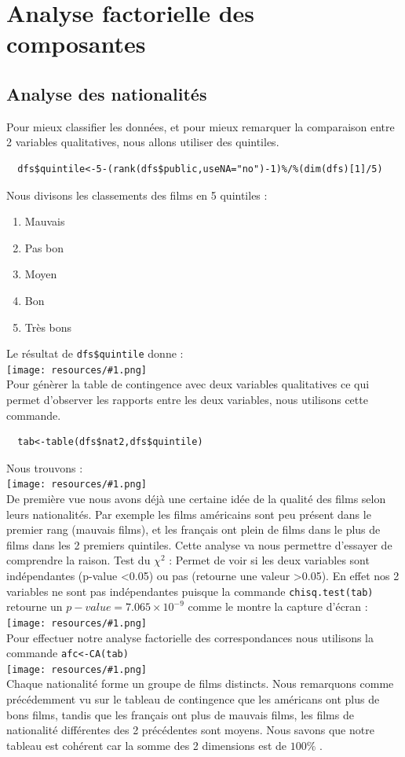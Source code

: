 \documentclass{report}
\newcommand{\photo}[1]{\\
    \texttt{[image: resources/\#1.png]}
\\
}
\begin{document}
\section{Analyse factorielle des composantes}
\subsection{Analyse des nationalités}
Pour mieux classifier les données, et pour mieux remarquer la comparaison entre 2 variables qualitatives, nous
allons utiliser des quintiles.

\begin{verbatim}
  dfs$quintile<-5-(rank(dfs$public,useNA="no")-1)%/%(dim(dfs)[1]/5)
\end{verbatim}
Nous divisons les classements des films en 5 quintiles :
\begin{enumerate}
  \item Mauvais
  \item Pas bon
  \item Moyen
  \item Bon
  \item Très bons
\end{enumerate}
Le résultat de \texttt{dfs\$quintile} donne :
\photo{30}
Pour génèrer la table de contingence avec deux variables qualitatives ce qui permet d'observer les
rapports entre les deux variables, nous utilisons cette commande.
\begin{verbatim}
  tab<-table(dfs$nat2,dfs$quintile)
\end{verbatim}
Nous trouvons :
\photo{31}
De première vue nous avons déjà une certaine idée de la qualité des films selon leurs nationalités.
Par exemple les films américains sont peu présent dans le premier rang (mauvais films), et les français
ont plein de films dans le plus de films dans les 2 premiers quintiles. Cette analyse va nous permettre
d'essayer de comprendre la raison.
Test du $\chi^2$ : Permet de voir si les deux variables sont indépendantes (p-value <0.05) ou pas
(retourne une valeur >0.05). En effet nos 2 variables ne sont pas indépendantes puisque
la commande \texttt{chisq.test(tab)} retourne un $p-value=7.065\times10^{-9}$
comme le montre la capture d'écran :
\photo{32}
Pour effectuer notre analyse factorielle des correspondances nous utilisons la commande \texttt{afc<-CA(tab)}
\photo{33}
Chaque nationalité forme un groupe de films distincts. Nous remarquons comme précédemment vu sur le
tableau de contingence que les américans ont plus de bons films, tandis que les français ont plus
de mauvais films, les films de nationalité différentes des 2 précédentes sont moyens.
Nous savons que notre tableau est cohérent car la somme des 2 dimensions est de $100\%$ .
\end{document}
